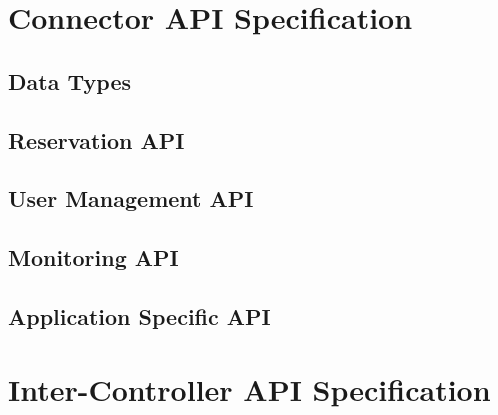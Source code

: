 \documentclass[a4paper]{report}
\begin{document}
\chapter{Connector API Specification}

\section{Data Types}

\section{Reservation API}

\section{User Management API}

\section{Monitoring API}

\section{Application Specific API}




\chapter{Inter-Controller API Specification}




\end{document}
